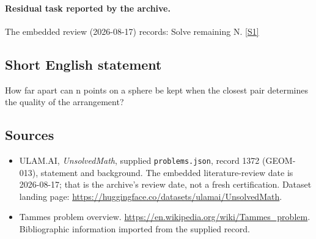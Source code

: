 \documentclass[11pt,a4paper]{article}
\newcommand{\sref}[2]{\hyperlink{source:#1:#2}{[S#2]}}
\begin{document}
\paragraph{Residual task reported by the archive.}

The embedded review (2026-08-17) records: Solve remaining N. \sref{1372}{1}

\subsection{Short English statement}

How far apart can n points on a sphere be kept when the closest pair determines the quality of the arrangement?

\subsection{Sources}

{\small

\begin{itemize}

\item[\hypertarget{source:1372:1}{S1}] ULAM.AI, \emph{UnsolvedMath}, supplied \texttt{problems.json}, record 1372 (GEOM-013), statement and background. The embedded literature-review date is 2026-08-17; that is the archive’s review date, not a fresh certification. Dataset landing page: \url{https://huggingface.co/datasets/ulamai/UnsolvedMath}.

\item[\hypertarget{source:1372:2}{S2}] Tammes problem overview. \url{https://en.wikipedia.org/wiki/Tammes_problem}. Bibliographic information imported from the supplied record.

\end{itemize}

}

\label{end:1372}
\end{document}
